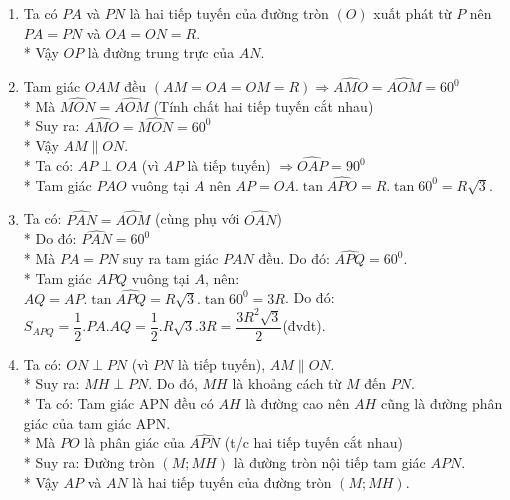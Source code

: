 \begin{ex}
{\begin{center}
	\end{center}
		\begin{enumerate}
			\item Ta có $PA$ và $PN$ là hai tiếp tuyến của đường tròn $(O)$ xuất phát từ $P$ nên $PA=PN$ và $OA=ON=R$.\\*
			Vậy $OP$ là đường trung trực của $AN$.
			\item Tam giác $OAM$ đều $\left(AM=OA=OM=R\right)\Rightarrow \widehat{AMO}=\widehat{AOM}=60^{0}$\\*
			Mà $\widehat{MON}=\widehat{AOM}$ (Tính chất hai tiếp tuyến cắt nhau)\\*
			Suy ra: $\widehat{AMO}=\widehat{MON}=60^{0}$ \\*
			Vậy $AM\parallel ON$.\\*
			Ta có: $AP\perp OA$ (vì $AP$ là tiếp tuyến)
			 $\Rightarrow \widehat{OAP}=90^{0}$\\*
			Tam giác $PAO$ vuông tại $A$ nên $AP=OA.\tan\widehat{APO}=R.\tan60^{0}=R\sqrt{3}$.
			\item Ta có: $\widehat{PAN}=\widehat{AOM}$ (cùng phụ với $\widehat{OAN}$)\\*
			Do đó: $\widehat{PAN}=60^{0}$\\*
			Mà $PA=PN$ suy ra tam giác $PAN$ đều. Do đó: $\widehat{APQ}=60^{0}$.\\*
			Tam giác $APQ$ vuông tại $A$, nên: $AQ=AP.\tan\widehat{APQ}=R\sqrt{3}.\tan60^{0}=3R$.
			Do đó: $S_{APQ}=\dfrac{1}{2}.PA.AQ=\dfrac{1}{2}.R\sqrt{3}.3R=\dfrac{3R^{2}\sqrt{3}}{2}$(đvdt).
			\item Ta có: $ON\perp PN$ (vì $PN$ là tiếp tuyến), $AM\parallel ON$.\\*
			Suy ra: $MH\perp PN$. Do đó, $MH$ là khoảng cách từ $M$ đến $PN$.\\*
			Ta có: Tam giác APN đều có $AH$ là đường cao nên $AH$ cũng là đường phân giác của tam giác APN.\\*
			Mà $PO$ là phân giác của $\widehat{APN}$ (t/c hai tiếp tuyến cắt nhau)\\*
			Suy ra: Đường tròn $(M;MH)$ là đường tròn nội tiếp tam giác $APN$.\\*
			Vậy $AP$ và $AN$ là hai tiếp tuyến của đường tròn $(M;MH)$.
		\end{enumerate}
    	}
\end{ex}


